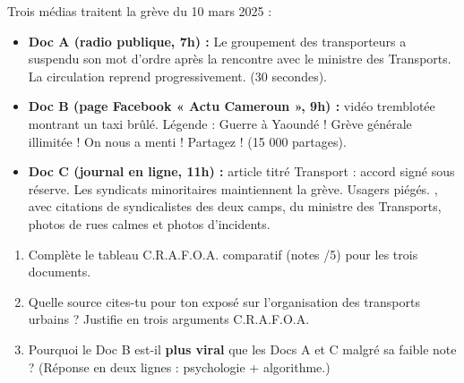 \documentclass[11pt]{article}
\begin{document}
\begin{exercice}
Trois médias traitent la grève du 10 mars 2025 :
\begin{itemize}
    \item \textbf{Doc A (radio publique, 7h) :} \og{} Le groupement des transporteurs a suspendu son mot d'ordre après la rencontre avec le ministre des Transports. La circulation reprend progressivement. \fg{} (30 secondes).
    \item \textbf{Doc B (page Facebook « Actu Cameroun », 9h) :} vidéo tremblotée montrant un taxi brûlé. Légende : \og{} Guerre à Yaoundé ! Grève générale illimitée ! On nous a menti ! Partagez ! \fg{} (15 000 partages).
    \item \textbf{Doc C (journal en ligne, 11h) :} article titré \og{} Transport : accord signé sous réserve. Les syndicats minoritaires maintiennent la grève. Usagers piégés. \fg{}, avec citations de syndicalistes des deux camps, du ministre des Transports, photos de rues calmes et photos d'incidents.
\end{itemize}
\begin{enumerate}
    \item Complète le tableau C.R.A.F.O.A. comparatif (notes /5) pour les trois documents.
    \item Quelle source cites-tu pour ton exposé sur \og{} l'organisation des transports urbains \fg{} ? Justifie en trois arguments C.R.A.F.O.A.
    \item Pourquoi le Doc B est-il \textbf{plus viral} que les Docs A et C malgré sa faible note ? (Réponse en deux lignes : psychologie + algorithme.)
\end{enumerate}
\end{exercice}
\end{document}
